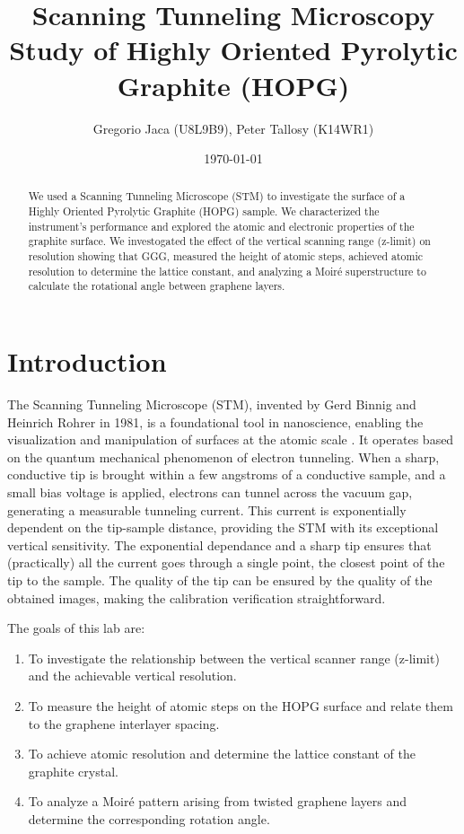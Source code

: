 \documentclass[12pt,a4paper]{article}
\title{Scanning Tunneling Microscopy Study of Highly Oriented Pyrolytic Graphite (HOPG)}
\author{Gregorio Jaca (U8L9B9), Peter Tallosy (K14WR1)}
\date{\today}
\begin{document}
\maketitle

\begin{abstract}
We used a Scanning Tunneling Microscope (STM) to investigate the surface of a Highly Oriented Pyrolytic Graphite (HOPG) sample. We characterized the instrument's performance and explored the atomic and electronic properties of the graphite surface. We investogated the effect of the vertical scanning range (z-limit) on resolution showing that GGG, measured the height of atomic steps, achieved atomic resolution to determine the lattice constant, and analyzing a Moiré superstructure to calculate the rotational angle between graphene layers. %

\end{abstract}

\section{Introduction}
The Scanning Tunneling Microscope (STM), invented by Gerd Binnig and Heinrich Rohrer in 1981, is a foundational tool in nanoscience, enabling the visualization and manipulation of surfaces at the atomic scale \cite{stm_manual}. It operates based on the quantum mechanical phenomenon of electron tunneling. When a sharp, conductive tip is brought within a few angstroms of a conductive sample, and a small bias voltage is applied, electrons can tunnel across the vacuum gap, generating a measurable tunneling current. This current is exponentially dependent on the tip-sample distance, providing the STM with its exceptional vertical sensitivity. The exponential dependance and a sharp tip ensures that (practically) all the current goes through a single point, the closest point of the tip to the sample. The quality of the tip can be ensured by the quality of the obtained images, making the calibration verification straightforward.

The goals of this lab are:
\begin{enumerate}
    \item To investigate the relationship between the vertical scanner range (z-limit) and the achievable vertical resolution.
    \item To measure the height of atomic steps on the HOPG surface and relate them to the graphene interlayer spacing.
    \item To achieve atomic resolution and determine the lattice constant of the graphite crystal.
    \item To analyze a Moiré pattern arising from twisted graphene layers and determine the corresponding rotation angle.
\end{enumerate}
\end{document}
